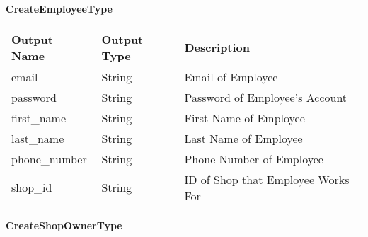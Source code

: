 \documentclass[12pt, titlepage]{article}
\begin{document}
\textbf{CreateEmployeeType}

\begin{table}[H]
	\begin{tabular}{|p{}|p{}|p{}|}
		\hline
		\textbf{Output Name} & \textbf{Output Type} & \textbf{Description}               \\
		\hline
		email                & String               & Email of Employee                  \\
		\hline
		password             & String               & Password of Employee's Account     \\
		\hline
		first\_name          & String               & First Name of Employee             \\
		\hline
		last\_name           & String               & Last Name of Employee              \\
		\hline
		phone\_number        & String               & Phone Number of Employee           \\
		\hline
		shop\_id             & String               & ID of Shop that Employee Works For \\
		\hline
	\end{tabular}
\end{table}

\textbf{CreateShopOwnerType}
\end{document}
